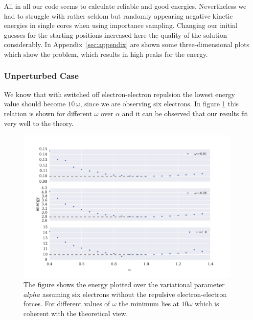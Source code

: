 All in all our code seems to calculate reliable and good energies. Nevertheless we had to struggle with rather seldom but randomly appearing negative kinetic energies in single cores when using importance sampling. Changing our initial guesses for the starting positions increased here the quality of the solution considerably. In Appendix~\ref{sec:appendix} are shown some three-dimensional plots which show the problem, which results in high peaks for the energy. 

\subsubsection{Unperturbed Case}
We know that with switched off electron-electron repulsion the lowest energy value should become $10\,\omega$, since we are observing six electrons. In figure \ref{fig:six_electron_unperturbed} this relation is shown for different $\omega$ over $\alpha$ and it can be observed that our results fit very well to the theory. 
\begin{figure}[htbp]
    \centering
    \includegraphics[scale=0.65]{six_electron_unperturbed}
    \caption{The figure shows the energy plotted over the variational parameter $alpha$ assuming six electrons without the repulsive electron-electron forces. For different values of $\omega$ the minimum lies at $10\omega$ which is coherent with the theoretical view.}
    \label{fig:six_electron_unperturbed}
\end{figure}

